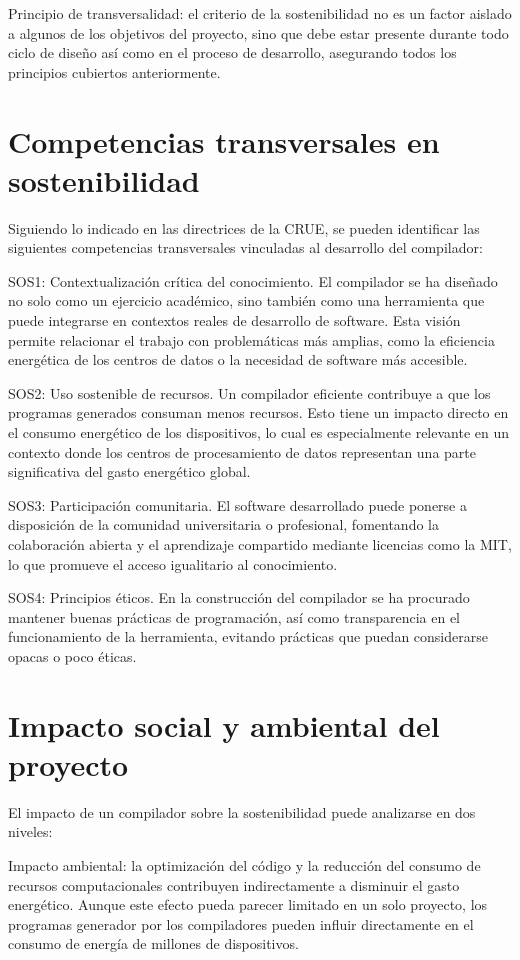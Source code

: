 Principio de transversalidad: el criterio de la sostenibilidad no es un factor aislado a algunos de los objetivos del proyecto, sino que debe estar presente durante todo ciclo de diseño así como en el proceso de desarrollo, asegurando todos los principios cubiertos anteriormente.

\section{Competencias transversales en sostenibilidad}
Siguiendo lo indicado en las directrices de la CRUE, se pueden identificar las siguientes competencias transversales vinculadas al desarrollo del compilador:

SOS1: Contextualización crítica del conocimiento. El compilador se ha diseñado no solo como un ejercicio académico, sino también como una herramienta que puede integrarse en contextos reales de desarrollo de software. Esta visión permite relacionar el trabajo con problemáticas más amplias, como la eficiencia energética de los centros de datos o la necesidad de software más accesible.

SOS2: Uso sostenible de recursos. Un compilador eficiente contribuye a que los programas generados consuman menos recursos. Esto tiene un impacto directo en el consumo energético de los dispositivos, lo cual es especialmente relevante en un contexto donde los centros de procesamiento de datos representan una parte significativa del gasto energético global.

SOS3: Participación comunitaria. El software desarrollado puede ponerse a disposición de la comunidad universitaria o profesional, fomentando la colaboración abierta y el aprendizaje compartido mediante licencias como la MIT, lo que promueve el acceso igualitario al conocimiento.

SOS4: Principios éticos. En la construcción del compilador se ha procurado mantener buenas prácticas de programación, así como transparencia en el funcionamiento de la herramienta, evitando prácticas que puedan considerarse opacas o poco éticas.

\section{Impacto social y ambiental del proyecto}

El impacto de un compilador sobre la sostenibilidad puede analizarse en dos niveles:

Impacto ambiental: la optimización del código y la reducción del consumo de recursos computacionales contribuyen indirectamente a disminuir el gasto energético. Aunque este efecto pueda parecer limitado en un solo proyecto, los programas generador por los compiladores pueden influir directamente en el consumo de energía de millones de dispositivos.

